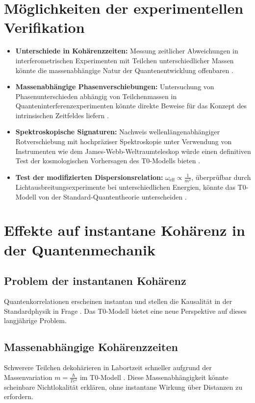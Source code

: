 \documentclass[12pt,a4paper]{article}
\begin{document}
	\section{Möglichkeiten der experimentellen Verifikation}
	\begin{itemize}
		\item \textbf{Unterschiede in Kohärenzzeiten:} Messung zeitlicher Abweichungen in interferometrischen Experimenten mit Teilchen unterschiedlicher Massen könnte die massenabhängige Natur der Quantenentwicklung offenbaren \cite{pascher_erweiterung_2025}.
		
		\item \textbf{Massenabhängige Phasenverschiebungen:} Untersuchung von Phasenunterschieden abhängig von Teilchenmassen in Quanteninterferenzexperimenten könnte direkte Beweise für das Konzept des intrinsischen Zeitfeldes liefern \cite{pascher_feldtheorie_2025}.
		
		\item \textbf{Spektroskopische Signaturen:} Nachweis wellenlängenabhängiger Rotverschiebung mit hochpräziser Spektroskopie unter Verwendung von Instrumenten wie dem James-Webb-Weltraumteleskop würde einen definitiven Test der kosmologischen Vorhersagen des T0-Modells bieten \cite{pascher_messdifferenzen_2025}.
		
		\item \textbf{Test der modifizierten Dispersionsrelation:} \( \omega_{\text{eff}} \propto \frac{1}{m^2} \), überprüfbar durch Lichtausbreitungsexperimente bei unterschiedlichen Energien, könnte das T0-Modell von der Standard-Quantentheorie unterscheiden \cite{pascher_photons_2025}.
	\end{itemize}
	
	\section{Effekte auf instantane Kohärenz in der Quantenmechanik}
	\subsection{Problem der instantanen Kohärenz}
	Quantenkorrelationen erscheinen instantan und stellen die Kausalität in der Standardphysik in Frage \cite{bell}. Das T0-Modell bietet eine neue Perspektive auf dieses langjährige Problem.
	
	\subsection{Massenabhängige Kohärenzzeiten}
	Schwerere Teilchen dekohärieren in Labortzeit schneller aufgrund der Massenvariation \( m = \frac{\hbar}{T c^2} \) im T0-Modell \cite{pascher_galaxies_2025, pascher_feldtheorie_2025}. Diese Massenabhängigkeit könnte scheinbare Nichtlokalität erklären, ohne instantane Wirkung über Distanzen zu erfordern.
	
\end{document}
